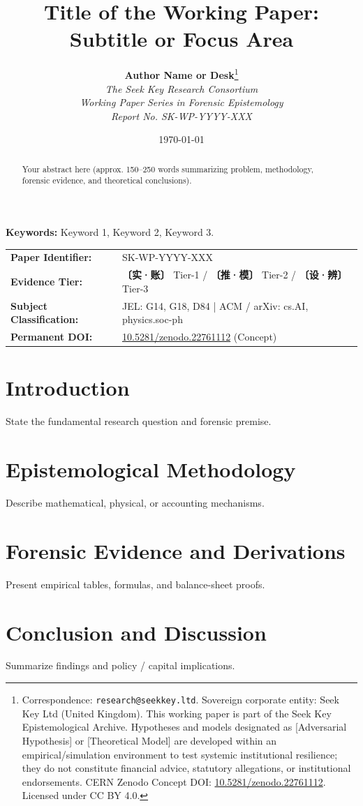 \documentclass[11pt,a4paper]{article}
\title{\textbf{Title of the Working Paper: \\ \large Subtitle or Focus Area}}
\author{
    \textbf{Author Name or Desk}\thanks{Correspondence: \texttt{research@seekkey.ltd}. Sovereign corporate entity: Seek Key Ltd (United Kingdom). This working paper is part of the Seek Key Epistemological Archive. Hypotheses and models designated as [Adversarial Hypothesis] or [Theoretical Model] are developed within an empirical/simulation environment to test systemic institutional resilience; they do not constitute financial advice, statutory allegations, or institutional endorsements. CERN Zenodo Concept DOI: \href{https://doi.org/10.5281/zenodo.22761112}{10.5281/zenodo.22761112}. Licensed under CC BY 4.0.} \\
    \textit{The Seek Key Research Consortium} \\
    \textit{Working Paper Series in Forensic Epistemology} \\
    \textit{Report No. SK-WP-YYYY-XXX}
}
\date{\today}
\begin{document}
\maketitle

\begin{abstract}
Your abstract here (approx. 150--250 words summarizing problem, methodology, forensic evidence, and theoretical conclusions).
\end{abstract}

\vspace{0.5em}
\noindent \textbf{Keywords:} Keyword 1, Keyword 2, Keyword 3.

\vspace{1em}
\begin{center}
\small
\begin{tabular}{ll}
\toprule
\textbf{Paper Identifier:} & SK-WP-YYYY-XXX \\
\textbf{Evidence Tier:} & \textbf{〔实·账〕} Tier-1 / \textbf{〔推·模〕} Tier-2 / \textbf{〔设·辨〕} Tier-3 \\
\textbf{Subject Classification:} & JEL: G14, G18, D84 \quad | \quad ACM / arXiv: cs.AI, physics.soc-ph \\
\textbf{Permanent DOI:} & \href{https://doi.org/10.5281/zenodo.22761112}{10.5281/zenodo.22761112} (Concept) \\
\bottomrule
\end{tabular}
\end{center}

\newpage

\section{Introduction}

State the fundamental research question and forensic premise.

\section{Epistemological Methodology}

Describe mathematical, physical, or accounting mechanisms.

\section{Forensic Evidence and Derivations}

Present empirical tables, formulas, and balance-sheet proofs.

\section{Conclusion and Discussion}

Summarize findings and policy / capital implications.



\end{document}
